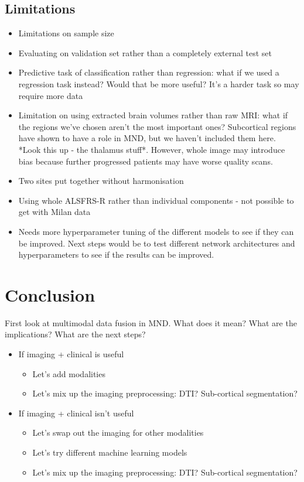 \subsection{Limitations}
\begin{itemize}
    \item Limitations on sample size
    \item Evaluating on validation set rather than a completely external test set
    \item Predictive task of classification rather than regression: what if we used a regression task instead? Would that be more useful? It's a harder task so may require more data
    \item Limitation on using extracted brain volumes rather than raw MRI: what if the regions we've chosen aren't the most important ones? Subcortical regions have shown to have a role in MND, but we haven't included them here. *Look this up - the thalamus stuff*. However, whole image may introduce bias because further progressed patients may have worse quality scans.
    \item Two sites put together without harmonisation
    \item Using whole ALSFRS-R rather than individual components - not possible to get with Milan data
    \item Needs more hyperparameter tuning of the different models to see if they can be improved. Next steps would be to test different network architectures and hyperparameters to see if the results can be improved.
\end{itemize}

\section{Conclusion}
First look at multimodal data fusion in MND. What does it mean? What are the implications? What are the next steps?
\begin{itemize}
    \item If imaging + clinical is useful
    \begin{itemize}
        \item Let's add modalities
        \item Let's mix up the imaging preprocessing: DTI? Sub-cortical segmentation?
    \end{itemize}
    \item If imaging + clinical isn't useful
    \begin{itemize}
        \item Let's swap out the imaging for other modalities
        \item Let's try different machine learning models
        \item Let's mix up the imaging preprocessing: DTI? Sub-cortical segmentation?
    \end{itemize}
\end{itemize}
